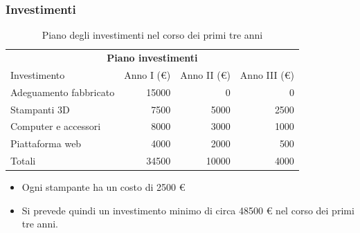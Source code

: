 \documentclass{beamer}
\begin{document}
    \begin{frame}
        \frametitle{Investimenti}
            \begin{table}[h]
                \begin{tabular}{lrrr}
                    \hline
                    \multicolumn{4}{c}{\textbf{Piano investimenti}} \\
                    \cline{1-4}
                    Investimento & Anno I (\euro{}) & Anno II (\euro{}) & Anno 
III (\euro{}) \\  \hline
                    Adeguamento fabbricato & 15000 & 0 & 0 \\
                    Stampanti 3D & 7500 & 5000 & 2500 \\
                    Computer e accessori & 8000 & 3000 & 1000 \\
                    Piattaforma web & 4000  & 2000  & 500  \\ \hline
                    Totali & 34500  & 10000  & 4000  \\ 
                    \hline
                \end{tabular}
                \caption{Piano degli investimenti nel corso dei primi tre 
anni}
            \end{table}
            \begin{itemize}
                \item Ogni stampante ha un costo di 2500 \euro{}
                \item Si prevede quindi un investimento minimo di circa 48500
\euro{} nel corso dei primi tre anni. 
            \end{itemize}
    \end{frame}
\end{document}
